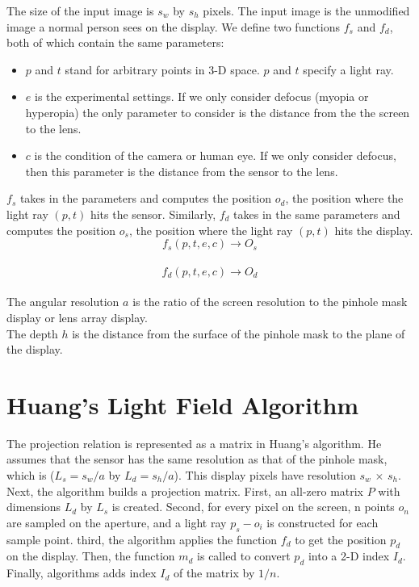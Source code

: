 The size of the input image is $s_w$ by $s_h$ pixels. The input image is the unmodified image a normal person sees on the display.
We define two functions $f_s$ and $f_d$, both of which contain the same parameters:
\begin{itemize}
\item $p$ and $t$ stand for arbitrary points in 3-D space. $p$ and $t$ specify a light ray.

\item $e$ is the experimental settings. If we only consider defocus (myopia or hyperopia) the only parameter to consider is the distance from the the screen to the lens.

\item $c$ is the condition of the camera or human eye. If we only consider defocus, then this parameter is the distance from the sensor to the lens.

\end{itemize}

$f_s$ takes in the parameters and computes the position $o_d$, the position where the light ray $(p,t)$ hits the sensor. Similarly, $f_d$ takes in the same parameters and computes the position $o_s$, the position where the light ray $(p, t)$ hits the display. \\
$$f_s(p, t, e, c) \rightarrow O_s$$ \\
$$f_d(p, t, e, c) \rightarrow O_d$$ \\
The angular resolution $a$ is the ratio of the screen resolution to the pinhole mask display or lens array display. \\
The depth $h$ is the distance from the surface of the pinhole mask to the plane of the display.

\section{Huang's Light Field Algorithm}

The projection relation is represented as a matrix in Huang's algorithm. He assumes that the sensor has the same resolution as that of the pinhole mask, which is ($L_s = s_w / a$ by $L_d = s_h / a$). This display pixels have resolution $s_w$ $\times$ $s_h$. 
Next, the algorithm builds a projection matrix. First, an all-zero matrix $P$ with dimensions $L_d$ by $L_s$ is created. Second, for every pixel on the screen, n points $o_n$ are sampled on the aperture, and a light ray $p_s - o_i$ is constructed for each sample point. third, the algorithm applies the function $f_d$ to get the position $p_d$ on the display. Then, the function $m_d$ is called to convert $p_d$ into a 2-D index $I_d$. Finally, algorithms adds index $I_d$ of the matrix by $1/n$. 

